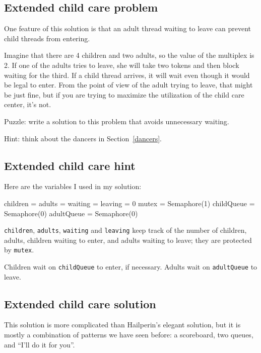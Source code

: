 \documentclass{book}
\begin{document}
\subsection {Extended child care problem}

One feature of this solution is that an adult thread waiting to leave
can prevent child threads from entering.

Imagine that there are 4 children and two adults, so the value of the
multiplex is 2.  If one of the adults tries to leave, she will take
two tokens and then block waiting for the third.  If a child thread
arrives, it will wait even though it would be legal to enter.
From the point of view of the adult trying to leave, that might
be just fine, but if you are trying to maximize the utilization
of the child care center, it's not.

Puzzle: write a solution to this problem that avoids unnecessary
waiting.

Hint: think about the dancers in Section~\ref{dancers}.




\subsection {Extended child care hint}

Here are the variables I used in my solution:

\begin{unbreakable}[title={Extended child care hint}]{}
children = adults = waiting = leaving = 0
mutex = Semaphore(1)
childQueue = Semaphore(0)
adultQueue = Semaphore(0)
\end{unbreakable}

{\tt children}, {\tt adults}, {\tt waiting} and {\tt leaving}
keep track of the number of children, adults, children waiting
to enter, and adults waiting to leave; they are protected by
    {\tt mutex}.

Children wait on {\tt childQueue} to enter, if necessary.
Adults wait on {\tt adultQueue} to leave.




\subsection {Extended child care solution}

This solution is more complicated than
Hailperin's elegant solution, but it is mostly a combination
of patterns we have seen before: a scoreboard, two queues,
and ``I'll do it for you''.
\end{document}
